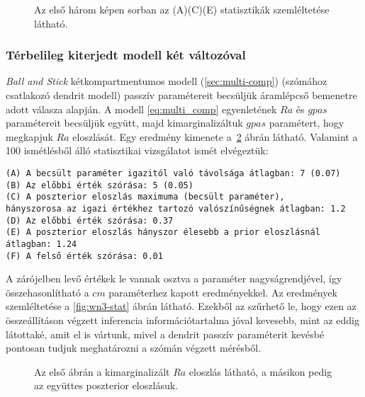 \begin{figure}
	\hfill
	\hfill
	\hfill
	\vfill
	\caption[Egykompartmentum, fehér zaj, két paraméter statisztika]{Az első három képen sorban az (A)(C)(E) statisztikák szemléltetése látható.}%
	\label{fig:wn2-stat}
\end{figure}

\FloatBarrier
\subsubsection{Térbelileg kiterjedt modell két változóval}
\textit{Ball and Stick} kétkompartmentumos modell (\ref{sec:multi-comp}) (szómához csatlakozó dendrit modell) passzív paramétereit becsüljük áramlépcső bemenetre adott válasza alapján. A modell \ref{eq:multi_comp} egyenletének $Ra$ és $gpas$ paramétereit becsüljük együtt, majd kimarginalizáltuk $gpas$ paramétert, hogy megkapjuk $Ra$ eloszlását. Egy eredmény kimenete a~\ref{fig:wn3} ábrán látható. Valamint a 100 ismétlésből álló statisztikai vizsgálatot ismét elvégeztük:

\begin{verbatim}
(A) A becsült paraméter igazitól való távolsága átlagban: 7 (0.07)
(B) Az előbbi érték szórása: 5 (0.05)
(C) A poszterior eloszlás maximuma (becsült paraméter), 
hányszorosa az igazi értékhez tartozó valószínűségnek átlagban: 1.2
(D) Az előbbi érték szórása: 0.37
(E) A poszterior eloszlás hányszor élesebb a prior eloszlásnál átlagban: 1.24
(F) A felső érték szórása: 0.01
\end{verbatim}
A zárójelben levő értékek le vannak osztva a paraméter nagyságrendjével, így összehasonlítható a $cm$ paraméterhez kapott eredményekkel. Az eredmények szemléltetése a \ref{fig:wn3-stat} ábrán látható. Ezekből az szűrhető le, hogy ezen az összeállításon végzett inferencia információtartalma jóval kevesebb, mint az eddig látottaké, amit el is vártunk, mivel a dendrit passzív paraméterit kevésbé pontosan tudjuk meghatározni a szómán végzett mérésből.

\begin{figure}
	\hfill
	\hfill
	\hfill
	\caption[Kétkompartmentumos, fehér zaj, két paraméteres becslés]{Az első ábrán a kimarginalizált $Ra$ eloszlás látható, a másikon pedig az együttes poszterior eloszlásuk. }%
	\label{fig:wn3}
\end{figure}

